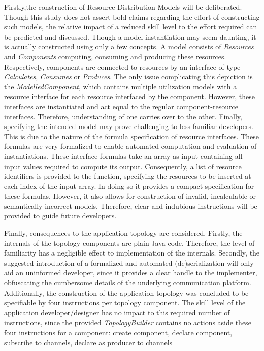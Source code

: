 Firstly,the construction of Resource Distribution Models will be deliberated. Though this study does not assert bold claims regarding the effort of constructing such models, the relative impact of a reduced skill level to the effort required can be predicted and discussed. Though a model instantiation may seem daunting, it is actually constructed using only a few concepts. A model consists of \emph{Resources} and \emph{Components} computing, consuming and producing these resources. Respectively, components are connected to resources by an interface of type \emph{Calculates}, \emph{Consumes} or \emph{Produces}. The only issue complicating this depiction is the \emph{ModelledComponent}, which contains multiple utilization models with a resource interface for each resource interfaced by the component. However, these interfaces are instantiated and act equal to the regular component-resource interfaces. Therefore, understanding of one carries over to the other. Finally, specifying the intended model may prove challenging to less familiar developers. This is due to the nature of the formula specification of resource interfaces. These formulas are very formalized to enable automated computation and evaluation of instantiations. These interface formulas take an array as input containing all input values required to compute its output. Consequently, a list of resource identifiers is provided to the function, specifying the resources to be inserted at each index of the input array. In doing so it provides a compact specification for these formulas. However, it also allows for construction of invalid, incalculable or semantically incorrect models. Therefore, clear and indubious instructions will be provided to guide future developers.

Finally, consequences to the application topology are considered. Firstly, the internals of the topology components are plain Java code. Therefore, the level of familiarity has a negligible effect to implementation of the internals. Secondly, the suggested introduction of a formalized and automated (de)serialization will only aid an uninformed developer, since it provides a clear handle to the implementer, obfuscating the cumbersome details of the underlying communication platform. Additionally, the construction of the application topology was concluded to be specifiable by four instructions per topology component. The skill level of the application developer/designer has no impact to this required number of instructions, since the provided \emph{TopologyBuilder} contains no actions aside these four instructions for a component: create component, declare component, subscribe to channels, declare as producer to channels


